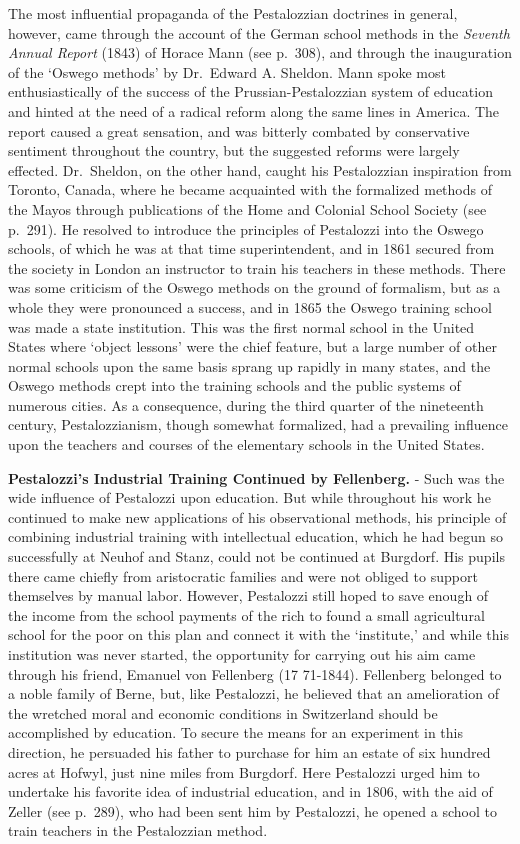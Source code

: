 \documentclass[]{book}
\begin{document}
The most influential propaganda of the Pestalozzian doctrines in general, however, came through the account of the German school methods in the \emph{Seventh Annual Report} (1843) of Horace Mann (see p.~308), and through the inauguration of the `Oswego methods' by Dr.~Edward A. Sheldon. Mann spoke most enthusiastically of the success of the Prussian-Pestalozzian system of education and hinted at the need of a radical reform along the same lines in America. The report caused a great sensation, and was bitterly combated by conservative sentiment throughout the country, but the suggested reforms were largely effected. Dr.~Sheldon, on the other hand, caught his Pestalozzian inspiration from Toronto, Canada, where he became acquainted with the formalized methods of the Mayos through publications of the Home and Colonial School Society (see p.~291). He resolved to introduce the principles of Pestalozzi into the Oswego schools, of which he was at that time superintendent, and in 1861 secured from the society in London an instructor to train his teachers in these methods. There was some criticism of the Oswego methods on the ground of formalism, but as a whole they were pronounced a success, and in 1865 the Oswego training school was made a state institution. This was the first normal school in the United States where `object lessons' were the chief feature, but a large number of other normal schools upon the same basis sprang up rapidly in many states, and the Oswego methods crept into the training schools and the public systems of numerous cities. As a consequence, during the third quarter of the nineteenth century, Pestalozzianism, though somewhat formalized, had a prevailing influence upon the teachers and courses of the elementary schools in the United States.

\textbf{Pestalozzi's Industrial Training Continued by Fellenberg.} - Such was the wide influence of Pestalozzi upon education. But while throughout his work he continued to make new applications of his observational methods, his principle of combining industrial training with intellectual education, which he had begun so successfully at Neuhof and Stanz, could not be continued at Burgdorf. His pupils there came chiefly from aristocratic families and were not obliged to support themselves by manual labor. However, Pestalozzi still hoped to save enough of the income from the school payments of the rich to found a small agricultural school for the poor on this plan and connect it with the `institute,' and while this institution was never started, the opportunity for carrying out his aim came through his friend, Emanuel von Fellenberg (17 71-1844). Fellenberg belonged to a noble family of Berne, but, like Pestalozzi, he believed that an amelioration of the wretched moral and economic conditions in Switzerland should be accomplished by education. To secure the means for an experiment in this direction, he persuaded his father to purchase for him an estate of six hundred acres at Hofwyl, just nine miles from Burgdorf. Here Pestalozzi urged him to undertake his favorite idea of industrial education, and in 1806, with the aid of Zeller (see p.~289), who had been sent him by Pestalozzi, he opened a school to train teachers in the Pestalozzian method.
\end{document}
